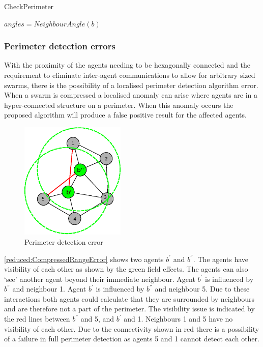 \begin{algorithm}[H]
\DontPrintSemicolon
\SetAlgoLined
\caption{CheckPerimeter}
$angles = NeighbourAngle(b)$\;
\label{algo:checkPerimeter}
\end{algorithm}

\subsubsection{Perimeter detection errors\label{section:PerimeterErrorLocalisation}}
With the proximity of the agents needing to be hexagonally connected and the requirement to eliminate inter-agent communications to allow for arbitrary sized swarms, there is the possibility of a localised perimeter detection algorithm error. When a swarm is compressed a localised anomaly can arise where agents are in a hyper-connected structure on a perimeter. When this anomaly occurs the proposed algorithm will produce a false positive result for the affected agents. 

\begin{figure}[H]
\begin{center}
\includegraphics[width=5cm]{CHAPTER-6/figures/PerimeterError1}
\end{center}
\caption{Perimeter detection error\label{reduced:CompressedRangeError}}
\end{figure}

\autoref{reduced:CompressedRangeError} shows two agents $b^{'}$ and $b^{''}$. The agents have visibility of each other as shown by the green field effects. The agents can also `see' another agent beyond their immediate neighbour. Agent $b^{'}$ is influenced by $b^{''}$ and neighbour 1. Agent $b^{'}$ is influenced by $b^{''}$ and neighbour 5. Due to these interactions both agents could calculate that they are surrounded by neighbours and are therefore not a part of the perimeter. The visibility issue is indicated by the red lines between $b^{''}$ and 5, and $b^{'}$ and 1. Neighbours 1 and 5 have no visibility of each other. Due to the connectivity shown in red there is a possibility of a failure in full perimeter detection as agents 5 and 1 cannot detect each other. 

